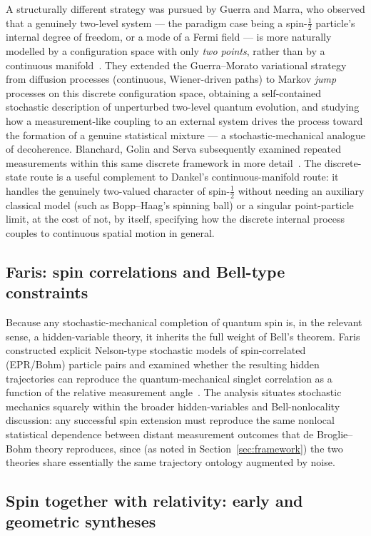 \documentclass[11pt]{article}
\begin{document}
A structurally different strategy was pursued by Guerra and Marra, who
observed that a genuinely two-level system --- the paradigm case being a
spin-$\tfrac12$ particle's internal degree of freedom, or a mode of a Fermi
field --- is more naturally modelled by a configuration space with only
\emph{two points}, rather than by a continuous
manifold~\cite{guerramarra84}. They extended the Guerra--Morato variational
strategy from diffusion processes (continuous, Wiener-driven paths) to
Markov \emph{jump} processes on this discrete configuration space,
obtaining a self-contained stochastic description of unperturbed two-level
quantum evolution, and studying how a measurement-like coupling to an
external system drives the process toward the formation of a genuine
statistical mixture --- a stochastic-mechanical analogue of decoherence.
Blanchard, Golin and Serva subsequently examined repeated measurements
within this same discrete framework in more
detail~\cite{blanchardgolinserva86}. The discrete-state route is a useful
complement to Dankel's continuous-manifold route: it handles the genuinely
two-valued character of spin-$\tfrac12$ without needing an auxiliary
classical model (such as Bopp--Haag's spinning ball) or a singular 
point-particle limit, at the cost of not, by itself, specifying how the
discrete internal process couples to continuous spatial motion in general.

\subsection{Faris: spin correlations and Bell-type constraints}

Because any stochastic-mechanical completion of quantum spin is, in the
relevant sense, a hidden-variable theory, it inherits the full weight of
Bell's theorem. Faris constructed explicit Nelson-type stochastic models of
spin-correlated (EPR/Bohm) particle pairs and examined whether the
resulting hidden trajectories can reproduce the quantum-mechanical singlet
correlation as a function of the relative measurement angle~\cite{faris82}.
The analysis situates stochastic mechanics squarely within the broader
hidden-variables and Bell-nonlocality discussion: any successful spin
extension must reproduce the same nonlocal statistical dependence between
distant measurement outcomes that de Broglie--Bohm theory reproduces, since
(as noted in Section~\ref{sec:framework}) the two theories share
essentially the same trajectory ontology augmented by noise.

\subsection{Spin together with relativity: early and geometric syntheses}
\end{document}
